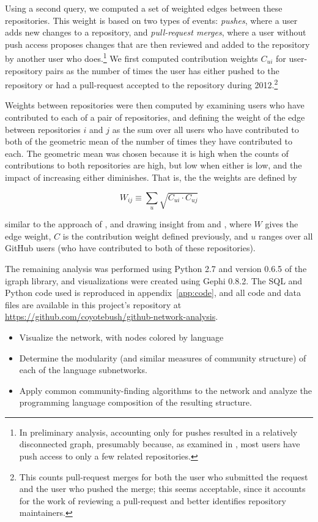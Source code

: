 \documentclass[twocolumn]{article}
\begin{document}
Using a second query, we computed a set of weighted edges between these
repositories. This weight is based on two types of events: \emph{pushes}, where
a user adds new changes to a repository, and \emph{pull-request merges}, where a
user without push access proposes changes that are then reviewed and added to
the repository by another user who does.\footnote{In preliminary analysis,
accounting only for pushes resulted in a relatively disconnected graph,
presumably because, as examined in \cite{khadke}, most users have push access to only a few related
repositories.} We first computed contribution weights $C_{ui}$ for
user-repository pairs as the number of times the user has either pushed to the
repository or had a pull-request accepted to the repository during
2012.\footnote{This counts pull-request merges for both the user who submitted
the request and the user who pushed the merge; this seems acceptable, since it
accounts for the work of reviewing a pull-request and better identifies
repository maintainers.}

Weights between repositories were then computed by examining users who have
contributed to each of a pair of repositories, and defining the weight of the
edge between repositories $i$ and $j$ as the sum over all users who have
contributed to both of the geometric mean of the number of times they have
contributed to each. The geometric mean was chosen because it is high when the
counts of contributions to both repositories are high, but low when either is
low, and the impact of increasing either diminishes. That is, the the weights
are defined by

\begin{equation}
    W_{ij} \equiv \sum_u \sqrt{C_{ui} \cdot C_{uj}}
\end{equation}

similar to the approach of \cite{marrama}, and drawing insight from
\cite{opsahlproj} and \cite{opsahl11}, where $W$ gives the edge weight, $C$ is
the contribution weight defined previously, and $u$ ranges over all GitHub users
(who have contributed to both of these repositories).

The remaining analysis was performed using Python 2.7 and version 0.6.5 of the
igraph library, and visualizations were created using Gephi 0.8.2. The SQL and
Python code used is reproduced in appendix~\ref{app:code}, and all code and data
files are available in this project's repository at
\url{https://github.com/coyotebush/github-network-analysis}.

\begin{itemize}
    \item Visualize the network, with nodes colored by language
    \item Determine the modularity (and similar measures of community structure)
        of each of the language subnetworks.
    \item Apply common community-finding algorithms to the network and analyze
        the programming language composition of the resulting structure.
\end{itemize}
\end{document}
